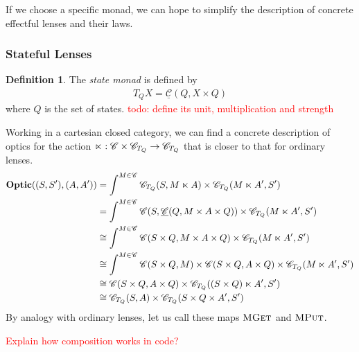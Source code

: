 \documentclass[11pt,a4paper]{article}
\theoremstyle{plain}
\theoremstyle{definition}
\newtheorem{definition}[theorem]{Definition}
\newcommand{\C}{\mathscr{C}}
\newcommand{\homC}{\underline{\C}}
\newcommand{\Optic}{\mathbf{Optic}}
\newcommand{\mget}{\textsc{MGet}}
\newcommand{\mput}{\textsc{MPut}}
\newcommand{\todo}[1]{\textcolor{red}{\small #1}}
\begin{document}
If we choose a specific monad, we can hope to simplify the description of concrete effectful lenses and their laws.

%

\subsubsection{Stateful Lenses}

\begin{definition}
The \emph{state monad} is defined by
\begin{align*}
T_Q X = \homC(Q, X \times Q)
\end{align*}
where $Q$ is the set of states.
\todo{todo: define its unit, multiplication and strength}
\end{definition}

Working in a cartesian closed category, we can find a concrete description of optics for the action $\monact : \C \times \C_{T_Q} \to \C_{T_Q}$ that is closer to that for ordinary lenses.
\begin{align*}
\Optic((S, S'), (A, A'))
&= \int^{M \in \C} \C_{T_Q}(S, M \monact A) \times \C_{T_Q}(M \monact A', S') \\
&= \int^{M \in \C} \C(S, \homC(Q, M \times A \times Q)) \times \C_{T_Q}(M \monact A', S') \\
&\cong \int^{M \in \C} \C(S \times Q, M \times A\times Q) \times \C_{T_Q}(M \monact A', S') \\
&\cong \int^{M \in \C} \C(S \times Q, M) \times \C(S \times Q, A\times Q) \times \C_{T_Q}(M \monact A', S') \\
&\cong \C(S \times Q, A \times Q) \times \C_{T_Q}((S \times Q) \monact A', S') \\
&\cong \C_{T_Q}(S, A) \times \C_{T_Q}(S \times Q \times A', S')
\end{align*}
By analogy with ordinary lenses, let us call these maps $\mget$ and $\mput$.

\todo{Explain how composition works in code?}
\end{document}
